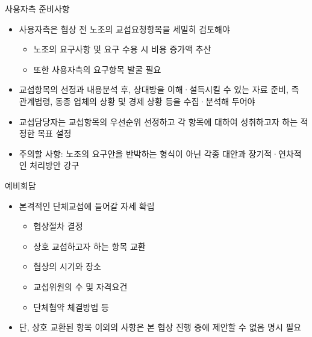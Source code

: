 \documentclass[aspectratio=169,xcolor=dvipsnames,handout]{beamer}
\begin{document}
\begin{frame}{사용자측 준비사항}
    \begin{itemize}[<+->]
        \item 사용자측은 협상 전 노조의 교섭요청항목을 세밀히 검토해야
        \begin{itemize}[<+->]
            \item 노조의 요구사항 및 요구 수용 시 비용 증가액 추산
            \item 또한 사용자측의 요구항목 발굴 필요 
        \end{itemize}
    \item 교섭항목의 선정과 내용분석 후, 상대방을 이해·설득시킬 수 있는 자료 준비, 즉 관계법령, 동종 업체의 상황 및 경제 상황 등을 수집·분석해 두어야 
    \item 교섭담당자는 교섭항목의 우선순위 선정하고 각 항목에 대하여 성취하고자 하는 적정한 목표 설정
    \item 주의할 사항: 노조의 요구안을 반박하는 형식이 아닌 각종 대안과 장기적·연차적인 처리방안 강구
    \end{itemize}
\end{frame}

\begin{frame}{예비회담}
    \begin{itemize}[<+->]
        \item 본격적인 단체교섭에 들어갈 자세 확립
        \begin{itemize}[<+->]
            \item 협상절차 결정
            \item 상호 교섭하고자 하는 항목 교환
            \item 협상의 시기와 장소
            \item 교섭위원의 수 및 자격요건
            \item 단체협약 체결방법 등
        \end{itemize}
    \item 단, 상호 교환된 항목 이외의 사항은 본 협상 진행 중에 제안할 수 없음 명시 필요
    \end{itemize}
\end{frame}
\end{document}
